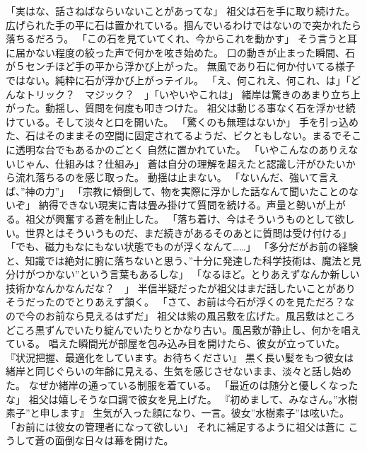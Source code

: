 \documentclass[uplatex]{utbook}
\begin{document}
「実はな、話さねばならいないことがあってな」
祖父は石を手に取り続けた。広げられた手の平に石は置かれている。掴んでいるわけではないので突かれたら落ちるだろう。
「この石を見ていてくれ、今からこれを動かす」
そう言うと耳に届かない程度の絞った声で何かを呟き始めた。
口の動きが止まった瞬間、石が５センチほど手の平から浮かび上がった。
無風であり石に何か付いてる様子ではない。純粋に石が浮かび上がっテイル。
「え、何これえ、何これ、は」「どんなトリック？　マジック？　」「いやいやこれは」
緒岸は驚きのあまり立ち上がった。動揺し、質問を何度も叩きつけた。
祖父は動じる事なく石を浮かせ続けている。そして淡々と口を開いた。
「驚くのも無理はないか」
手を引っ込めた、石はそのままその空間に固定されてるようだ、ビクともしない。まるでそこに透明な台でもあるかのごとく
自然に置かれていた。
「いやこんなのありえないじゃん、仕組みは？仕組み」
蒼は自分の理解を超えたと認識し汗がひたいから流れ落ちるのを感じ取った。
動揺は止まない。
「ないんだ、強いて言えば、”神の力”」
「宗教に傾倒して、物を実際に浮かした話なんて聞いたことのないぞ」
納得できない現実に青は畳み掛けて質問を続ける。声量と勢いが上がる。祖父が興奮する蒼を制止した。
「落ち着け、今はそういうものとして欲しい。世界とはそういうものだ、まだ続きがあるそのあとに質問は受け付ける」
「でも、磁力もなにもない状態でものが浮くなんて……」
「多分だがお前の経験と、知識では絶対に腑に落ちないと思う、”十分に発達した科学技術は、魔法と見分けがつかない”という言葉もあるしな」
「なるほど。とりあえずなんか新しい技術かなんかなんだな？　」
半信半疑だったが祖父はまだ話したいことがありそうだったのでとりあえず頷く。
「さて、お前は今石が浮くのを見ただろ？なので今のお前なら見えるはずだ」
祖父は紫の風呂敷を広げた。風呂敷はところどころ黒ずんでいたり綻んでいたりとかなり古い。風呂敷が静止し、何かを唱えている。
唱えた瞬間光が部屋を包み込み目を開けたら、彼女が立っていた。
『状況把握、最適化をしています。お待ちください』
黒く長い髪をもつ彼女は緒岸と同じぐらいの年齢に見える、生気を感じさせないまま、淡々と話し始めた。
なぜか緒岸の通っている制服を着ている。
「最近のは随分と優しくなったな」
祖父は嬉しそうな口調で彼女を見上げた。
『初めまして、みなさん。”水樹素子”と申します』
生気が入った顔になり、一言。彼女”水樹素子”は呟いた。
「お前には彼女の管理者になって欲しい」
それに補足するように祖父は蒼に
こうして蒼の面倒な日々は幕を開けた。
\end{document}
